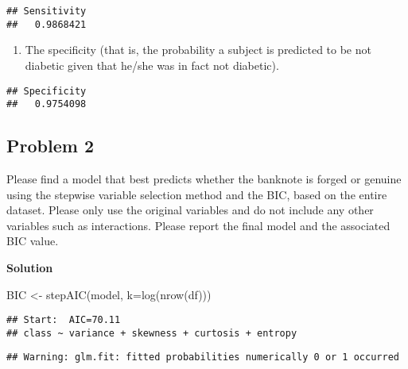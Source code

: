 \documentclass[
]{article}
\newenvironment{Shaded}{\begin{snugshade}}{\end{snugshade}}
\newcommand{\AttributeTok}[1]{\textcolor[rgb]{0.77,0.63,0.00}{#1}}
\newcommand{\DecValTok}[1]{\textcolor[rgb]{0.00,0.00,0.81}{#1}}
\newcommand{\FunctionTok}[1]{\textcolor[rgb]{0.00,0.00,0.00}{#1}}
\newcommand{\NormalTok}[1]{#1}
\newcommand{\OtherTok}[1]{\textcolor[rgb]{0.56,0.35,0.01}{#1}}
\newcommand{\SpecialCharTok}[1]{\textcolor[rgb]{0.00,0.00,0.00}{#1}}
\providecommand{\tightlist}{%
  \setlength{\itemsep}{0pt}\setlength{\parskip}{0pt}}
\begin{document}
\begin{verbatim}
## Sensitivity 
##   0.9868421
\end{verbatim}

\begin{enumerate}
\def\labelenumi{(\roman{enumi})}
\setcounter{enumi}{2}
\tightlist
\item
  The specificity (that is, the probability a subject is predicted to be
  not diabetic given that he/she was in fact not diabetic).
\end{enumerate}

\begin{Shaded}
\end{Shaded}

\begin{verbatim}
## Specificity 
##   0.9754098
\end{verbatim}

\hypertarget{problem-2}{%
\subsection{Problem 2}\label{problem-2}}

Please find a model that best predicts whether the banknote is forged or
genuine using the stepwise variable selection method and the BIC, based
on the entire dataset. Please only use the original variables and do not
include any other variables such as interactions. Please report the
final model and the associated BIC value.

\textbf{\large{Solution}}

\begin{Shaded}
\begin{Highlighting}[]
\NormalTok{BIC }\OtherTok{\textless{}{-}} \FunctionTok{stepAIC}\NormalTok{(model, }\AttributeTok{k=}\FunctionTok{log}\NormalTok{(}\FunctionTok{nrow}\NormalTok{(df)))}
\end{Highlighting}
\end{Shaded}

\begin{verbatim}
## Start:  AIC=70.11
## class ~ variance + skewness + curtosis + entropy
\end{verbatim}

\begin{verbatim}
## Warning: glm.fit: fitted probabilities numerically 0 or 1 occurred
\end{verbatim}
\end{document}
